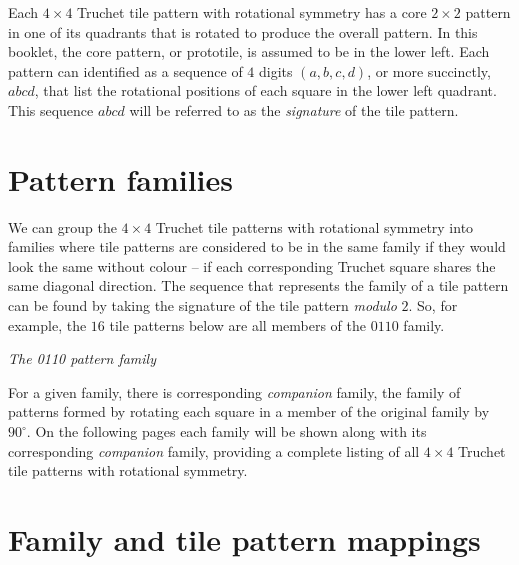 \documentclass{tufte-book}
\begin{document}
\vspace{0.3cm}
\noindent
\marginnote{\centering}Each $4\times 4$
Truchet tile pattern with rotational symmetry has a core $2\times 2$ pattern in one of its quadrants that is rotated to produce the overall pattern.  In this booklet, the core pattern, or prototile, is assumed to be in the lower left. Each pattern can identified as a sequence of $4$ digits $(a,b,c,d)$, or more succinctly, $abcd$, that list the rotational positions of each square in the lower left quadrant. This sequence $abcd$ will be referred to as the \textit{signature} of the tile pattern.

\chapter{Pattern families}

\noindent
We can group the $4\times 4$ Truchet tile patterns with rotational symmetry into families where  tile patterns are considered to be in the same family if they would look the same without colour -- if each corresponding Truchet square shares the same diagonal direction. The sequence that represents the family of a tile pattern can be found by taking the signature of the tile pattern \textit{modulo} $2$. So, for example, the $16$ tile patterns below are all members of the $0110$ family. 

\vspace{1.2cm}


{
\setlength{\tabcolsep}{3pt}
\renewcommand{\arraystretch}{2}

{\begin{center} \textit{The 0110 pattern family}\end{center}}
}

\vspace{0.5cm}

\noindent
For a given family, there is corresponding \textit{companion} family, the family of patterns formed by rotating each square in a member of the original family by $90^{\circ}$. On the following pages each family will be shown along with its corresponding \textit{companion} family, providing a complete listing of all $4\times 4$ Truchet tile patterns with rotational symmetry.
\newpage


\chapter{Family and tile pattern mappings}
\end{document}
